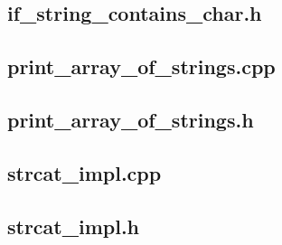 \documentclass[12pt,a4paper]{article}  %
\begin{document}
	\newpage
	\subsection*{if\_string\_contains\_char.h}
	
	
	\newpage
	\subsection*{print\_array\_of\_strings.cpp}
	
	
	\newpage
	\subsection*{print\_array\_of\_strings.h}
	
	
	\newpage
	\subsection*{strcat\_impl.cpp}
	
	
	\newpage
	\subsection*{strcat\_impl.h}
	
	
\end{document}

